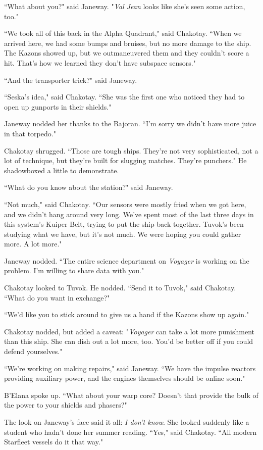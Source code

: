 \documentclass[twoside,letterpaper,12pt]{memoir}
\begin{document}
``What about you?" said Janeway. "\textit{Val Jean} looks like she's seen some action, too."

``We took all of this back in the Alpha Quadrant," said Chakotay. ``When we arrived here, we had some bumps and bruises, but no more damage to the ship. The Kazons showed up, but we outmaneuvered them and they couldn't score a hit. That's how we learned they don't have subspace sensors."

``And the transporter trick?" said Janeway.

``Seska's idea," said Chakotay. ``She was the first one who noticed they had to open up gunports in their shields."

Janeway nodded her thanks to the Bajoran. ``I'm sorry we didn't have more juice in that torpedo."

Chakotay shrugged. ``Those are tough ships. They're not very sophisticated, not a lot of technique, but they're built for slugging matches. They're punchers." He shadowboxed a little to demonstrate.

``What do you know about the station?" said Janeway.

``Not much," said Chakotay. ``Our sensors were mostly fried when we got here, and we didn't hang around very long. We've spent most of the last three days in this system's Kuiper Belt, trying to put the ship back together. Tuvok's been studying what we have, but it's not much. We were hoping you could gather more. A lot more."

Janeway nodded. ``The entire science department on \textit{Voyager} is working on the problem. I'm willing to share data with you."

Chakotay looked to Tuvok. He nodded. ``Send it to Tuvok," said Chakotay. ``What do you want in exchange?"

``We'd like you to stick around to give us a hand if the Kazons show up again."

Chakotay nodded, but added a caveat: "\textit{Voyager} can take a lot more punishment than this ship. She can dish out a lot more, too. You'd be better off if you could defend yourselves."

``We're working on making repairs," said Janeway. ``We have the impulse reactors providing auxiliary power, and the engines themselves should be online soon."

B'Elana spoke up. ``What about your warp core? Doesn't that provide the bulk of the power to your shields and phasers?"

The look on Janeway's face said it all: \textit{I don't know}. She looked suddenly like a student who hadn't done her summer reading. ``Yes," said Chakotay. ``All modern Starfleet vessels do it that way."
\end{document}
